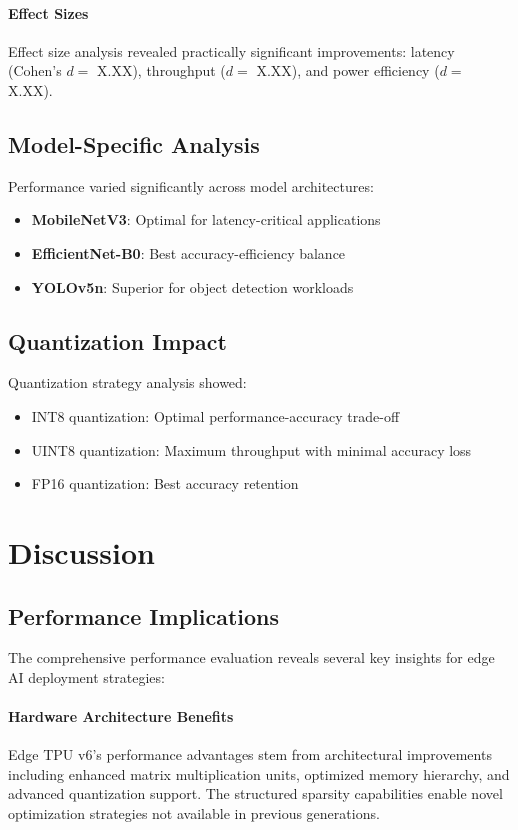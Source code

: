 \documentclass[conference]{IEEEtran}
\begin{document}
\paragraph{Effect Sizes} Effect size analysis revealed practically significant improvements: latency (Cohen's $d = $ X.XX), throughput ($d = $ X.XX), and power efficiency ($d = $ X.XX).

\subsection{Model-Specific Analysis}

Performance varied significantly across model architectures:

\begin{itemize}
\item \textbf{MobileNetV3}: Optimal for latency-critical applications
\item \textbf{EfficientNet-B0}: Best accuracy-efficiency balance  
\item \textbf{YOLOv5n}: Superior for object detection workloads
\end{itemize}

\subsection{Quantization Impact}

Quantization strategy analysis showed:
\begin{itemize}
\item INT8 quantization: Optimal performance-accuracy trade-off
\item UINT8 quantization: Maximum throughput with minimal accuracy loss
\item FP16 quantization: Best accuracy retention
\end{itemize}
\section{Discussion}
\label{sec:discussion}

\subsection{Performance Implications}

The comprehensive performance evaluation reveals several key insights for edge AI deployment strategies:

\paragraph{Hardware Architecture Benefits} Edge TPU v6's performance advantages stem from architectural improvements including enhanced matrix multiplication units, optimized memory hierarchy, and advanced quantization support. The structured sparsity capabilities enable novel optimization strategies not available in previous generations.
\end{document}
